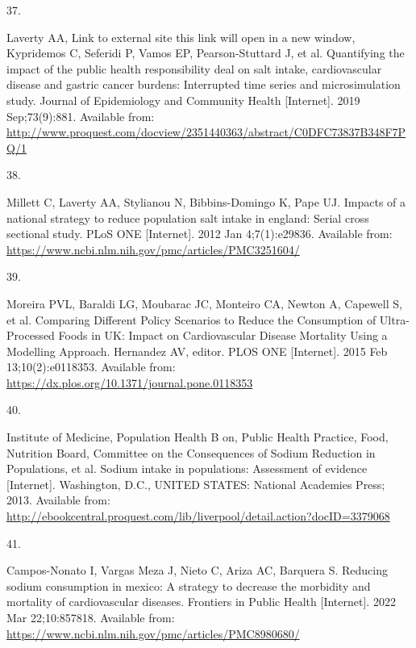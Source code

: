\documentclass[
]{article}
\newlength{\cslhangindent}
\newlength{\csllabelwidth}
\newlength{\cslentryspacingunit} %
\newenvironment{CSLReferences}[2] %
 {%
  \setlength{\parindent}{0pt}
  \ifodd #1
  \let\oldpar\par
  \def\par{\hangindent=\cslhangindent\oldpar}
  \fi
  \setlength{\parskip}{#2\cslentryspacingunit}
 }%
 {}
\newcommand{\CSLLeftMargin}[1]{\parbox[t]{\csllabelwidth}{#1}}
\newcommand{\CSLRightInline}[1]{\parbox[t]{\linewidth - \csllabelwidth}{#1}\break}
\begin{document}
\begin{CSLReferences}{0}{0}
\leavevmode{}%
\CSLLeftMargin{37. }%
\CSLRightInline{Laverty AA, Link to external site this link will open in
a new window, Kypridemos C, Seferidi P, Vamos EP, Pearson-Stuttard J, et
al. Quantifying the impact of the public health responsibility deal on
salt intake, cardiovascular disease and gastric cancer burdens:
Interrupted time series and microsimulation study. Journal of
Epidemiology and Community Health {[}Internet{]}. 2019 Sep;73(9):881.
Available from:
\url{http://www.proquest.com/docview/2351440363/abstract/C0DFC73837B348F7PQ/1}}

\leavevmode{}%
\CSLLeftMargin{38. }%
\CSLRightInline{Millett C, Laverty AA, Stylianou N, Bibbins-Domingo K,
Pape UJ. Impacts of a national strategy to reduce population salt intake
in england: Serial cross sectional study. PLoS ONE {[}Internet{]}. 2012
Jan 4;7(1):e29836. Available from:
\url{https://www.ncbi.nlm.nih.gov/pmc/articles/PMC3251604/}}

\leavevmode{}%
\CSLLeftMargin{39. }%
\CSLRightInline{Moreira PVL, Baraldi LG, Moubarac JC, Monteiro CA,
Newton A, Capewell S, et al. Comparing Different Policy Scenarios to
Reduce the Consumption of Ultra-Processed Foods in UK: Impact on
Cardiovascular Disease Mortality Using a Modelling Approach. Hernandez
AV, editor. PLOS ONE {[}Internet{]}. 2015 Feb 13;10(2):e0118353.
Available from: \url{https://dx.plos.org/10.1371/journal.pone.0118353}}

\leavevmode{}%
\CSLLeftMargin{40. }%
\CSLRightInline{Institute of Medicine, Population Health B on, Public
Health Practice, Food, Nutrition Board, Committee on the Consequences of
Sodium Reduction in Populations, et al. Sodium intake in populations:
Assessment of evidence {[}Internet{]}. Washington, D.C., UNITED STATES:
National Academies Press; 2013. Available from:
\url{http://ebookcentral.proquest.com/lib/liverpool/detail.action?docID=3379068}}

\leavevmode{}%
\CSLLeftMargin{41. }%
\CSLRightInline{Campos-Nonato I, Vargas Meza J, Nieto C, Ariza AC,
Barquera S. Reducing sodium consumption in mexico: A strategy to
decrease the morbidity and mortality of cardiovascular diseases.
Frontiers in Public Health {[}Internet{]}. 2022 Mar 22;10:857818.
Available from:
\url{https://www.ncbi.nlm.nih.gov/pmc/articles/PMC8980680/}}


\end{CSLReferences}
\end{document}
